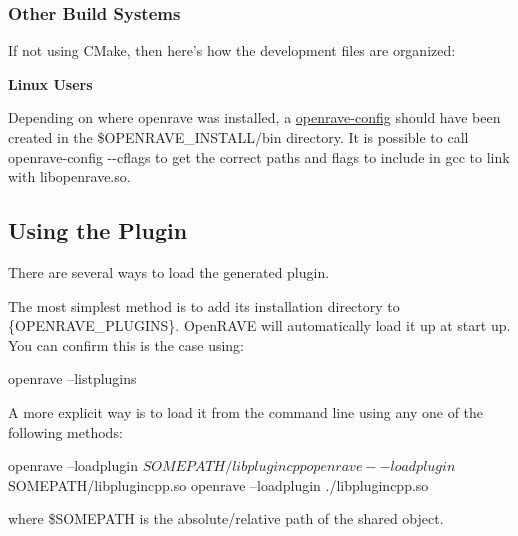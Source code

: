 \hypertarget{writing__plugins_writing_plugins_linux}{}\subsubsection{Other Build Systems}\label{writing__plugins_writing_plugins_linux}
If not using CMake, then here's how the development files are organized:

{\bfseries Linux Users}

Depending on where openrave was installed, a \hyperlink{openrave__config}{openrave-\/config} should have been created in the {\ttfamily \$OPENRAVE\_\-INSTALL/bin} directory. It is possible to call {\ttfamily openrave-\/config -\/-\/cflags} to get the correct paths and flags to include in gcc to link with {\ttfamily libopenrave.so}.\hypertarget{writing__plugins_writing_plugins_usage}{}\subsection{Using the Plugin}\label{writing__plugins_writing_plugins_usage}
There are several ways to load the generated plugin.


\begin{DoxyItemize}
\item The most simplest method is to add its installation directory to \{OPENRAVE\_\-PLUGINS\}. OpenRAVE will automatically load it up at start up. You can confirm this is the case using: \begin{DoxyVerb}
openrave --listplugins
\end{DoxyVerb}

\end{DoxyItemize}


\begin{DoxyItemize}
\item A more explicit way is to load it from the command line using any one of the following methods: \begin{DoxyVerb}
openrave --loadplugin $SOMEPATH/libplugincpp
openrave --loadplugin $SOMEPATH/libplugincpp.so
openrave --loadplugin ./libplugincpp.so
\end{DoxyVerb}
 where {\ttfamily \$SOMEPATH} is the absolute/relative path of the shared object.
\end{DoxyItemize}


